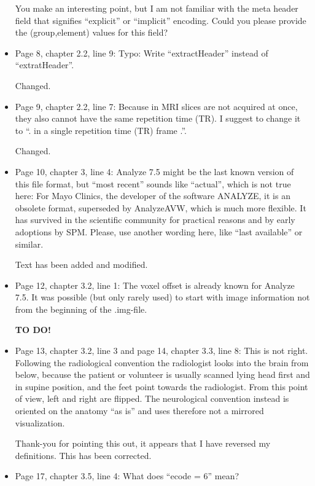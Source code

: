 \documentclass[11pt]{article}
\begin{document}
\begin{itemize}
  You make an interesting point, but I am not familiar with the meta
  header field that signifies ``explicit'' or ``implicit'' encoding.
  Could you please provide the (group,element) values for this field?

\item Page 8, chapter 2.2, line 9: Typo: Write ``extractHeader''
  instead of ``extratHeader''.

  Changed.

\item Page 9, chapter 2.2, line 7: Because in MRI slices are not
  acquired at once, they also cannot have the same repetition time
  (TR). I suggest to change it to ``. in a single repetition time (TR)
  frame .''.

  Changed.

\item Page 10, chapter 3, line 4: Analyze 7.5 might be the last known
  version of this file format, but ``most recent'' sounds like
  ``actual'', which is not true here: For Mayo Clinics, the developer
  of the software ANALYZE, it is an obsolete format, superseded by
  AnalyzeAVW, which is much more flexible. It has survived in the
  scientific community for practical reasons and by early adoptions by
  SPM. Please, use another wording here, like ``last available'' or
  similar.

  Text has been added and modified.

\item Page 12, chapter 3.2, line 1: The voxel offset is already known
  for Analyze 7.5. It was possible (but only rarely used) to start
  with image information not from the beginning of the .img-file.

  \textbf{TO DO!}

\item Page 13, chapter 3.2, line 3 and page 14, chapter 3.3, line 8:
  This is not right. Following the radiological convention the
  radiologist looks into the brain from below, because the patient or
  volunteer is usually scanned lying head first and in supine
  position, and the feet point towards the radiologist. From this
  point of view, left and right are flipped. The neurological
  convention instead is oriented on the anatomy ``as is'' and uses
  therefore not a mirrored visualization.

  Thank-you for pointing this out, it appears that I have reversed my
  definitions.  This has been corrected.

\item Page 17, chapter 3.5, line 4: What does ``ecode = 6'' mean?


\end{itemize}
\end{document}
